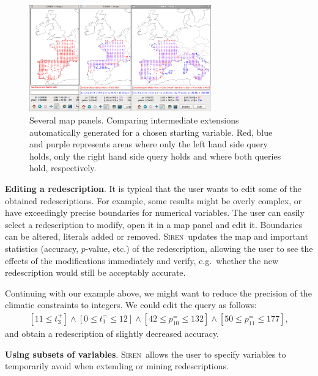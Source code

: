 \documentclass{llncs}
\newcommand{\prg}[1]{\textbf{#1}.}
\newcommand{\Siren}{\textsc{Siren}}
\begin{document}
\begin{figure}
  \centering
\includegraphics[width=0.7\textwidth]{screenshots/comparison}
  \caption{Several map panels. Comparing intermediate extensions automatically generated for a chosen starting variable. Red, blue and purple represents areas where only the left hand side query holds, only the right hand side query holds and where both queries hold, respectively.}
  \label{fig:comparison}
\end{figure}

\prg{Editing a redescription} It is typical that the user wants to
edit some of the obtained redescriptions. For example, some results
might be overly complex, or have exceedingly precise boundaries for
numerical variables. The user can easily select a redescription to
modify, open it in a map panel and edit it. Boundaries can be altered,
literals added or removed. \Siren\ updates the map and important
statistics (accuracy, $p$-value, etc.) of the redescription, allowing
the user to see the effects of the modifications immediately and
verify, e.g.\ whether the new redescription would still be acceptably
accurate.

Continuing with our example above, we might want to reduce the
precision of the climatic constraints to integers. We could edit the
query as follows:
\begin{equation*}
\begin{array}{l}
[11 \leq t_{3}^{+}] \land  [0 \leq t_{1}^{=} \leq 12]%
\land  [42 \leq p_{10}^{=} \leq 132] \land [50 \leq p_{11}^{=} \leq 177],
\end{array}
\end{equation*}
and obtain a redescription of slightly decreased accuracy. %

\prg{Using subsets of variables} 
\Siren\ allows the user to specify variables to temporarily 
avoid when extending or mining redescriptions.
\end{document}
